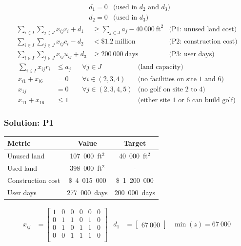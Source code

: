 \documentclass[a4paper,11pt]{article}
\begin{document}
\begin{align}
& d_1=0 & \text{(used in $d_2$ and $d_3$)} \\
& d_2=0 & \text{(used in $d_3$)}
\end{align}
\begin{align}
	\sum_{i\in I} \sum_{j\in J} x_{ij}r_i +d_1 & \geq \sum_{j\in J}a_j -40\ 000\ \text{ft}^2  & \text{(P1: unused land cost)} \\
 \sum_{i\in I} \sum_{j\in J} x_{ij}c_i - d_2& < \$1.2\  \text{million} & \text{(P2: construction cost)} \\
\sum_{i\in I} \sum_{j\in J} x_{ij}u_{ij} +d_3 & \geq 200\ 000\ \text{days}  & \text{(P3: user days)} 
\end{align}
\begin{align}
\sum_{i\in I} x_{ij}r_i &\leq a_j && \forall j\in J & \text{(land capacity)}        \\
x_{i1}+x_{i6} &= 0  && \forall i \in (2,3,4)  & \text{(no facilities on site 1 and 6)}\\
x_{1j} &= 0 && \forall j\in (2,3,4,5) & \text{(no golf on site 2 to 4)}\\
x_{11} + x_{16} &\leq 1 && & \text{(either site 1 or 6 can build golf)}
\end{align}
\subsubsection{Solution: P1}
\begin{center}
	\begin{tabular}{l c c}
		\hline
		\hline
		\textbf{Metric} & \textbf{Value} & \textbf{Target}\\
		\hline
		\hline
		Unused land & 107\ 000\ ft$^2$ & 40\ 000\ ft$^2$\\
		Used land & 398\ 000\ ft$^2$ & -\\
		Construction cost & \$\ 4\ 015\ 000 & \$\ 1\ 200\ 000 \\
		User days & 277\ 000\ days & 200\ 000\ days\\
		\hline
	\end{tabular}
\end{center}

\begin{align}
x_{ij} &= 
	\begin{bmatrix} 
    1  &  0  &  0  &  0  &  0  &  0 \\
    0  &  1  &  1  &  0  &  1  &  0 \\
    0  &  1  &  0  &  1  &  1  &  0 \\
    0  &  0  &  1  &  1  &  1  &  0 \\
	\end{bmatrix}
&d_1 &= 	\begin{bmatrix} 
    67\ 000  \end{bmatrix} & \min(z) = 67\ 000
\end{align}
\end{document}
